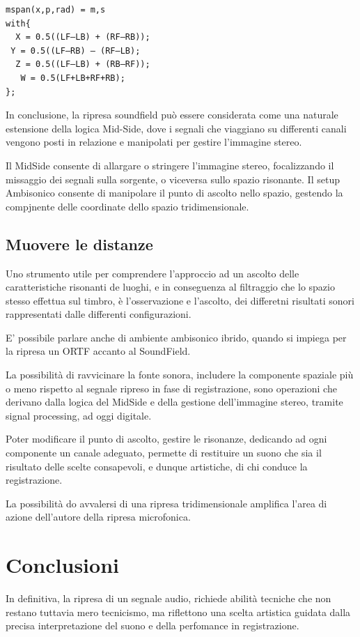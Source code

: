 \begin{lstlisting}
mspan(x,p,rad) = m,s
with{
  X = 0.5((LF–LB) + (RF–RB));
 Y = 0.5((LF–RB) – (RF–LB);
  Z = 0.5((LF–LB) + (RB–RF));
   W = 0.5(LF+LB+RF+RB);
};
\end{lstlisting}

In conclusione, la ripresa soundfield può essere considerata come una 
naturale estensione della logica Mid-Side, dove i segnali che viaggiano 
su differenti canali vengono posti in relazione e manipolati per gestire 
l'immagine stereo.

Il MidSide consente di allargare o stringere l'immagine stereo, focalizzando
il missaggio dei segnali sulla sorgente, o viceversa sullo spazio risonante.
Il setup Ambisonico consente di manipolare il punto di ascolto nello spazio, 
gestendo la compjnente delle coordinate dello spazio tridimensionale.


      
 \subsection*{Muovere le distanze}
 Uno strumento utile per comprendere l'approccio ad un ascolto delle 
 caratteristiche risonanti de luoghi, e in conseguenza al filtraggio che 
 lo spazio stesso effettua sul timbro, è l'osservazione e l'ascolto,
 dei differetni risultati sonori rappresentati dalle differenti configurazioni.
 
 E' possibile parlare anche di ambiente ambisonico ibrido, quando si impiega
 per la ripresa un ORTF accanto al SoundField.
 
 La possibilità di ravvicinare la fonte sonora, includere la componente spaziale
 più o meno rispetto al segnale ripreso in fase di registrazione, sono operazioni
 che derivano dalla logica del MidSide e della gestione dell'immagine stereo,
tramite signal processing, ad oggi digitale.

Poter modificare il punto di ascolto, gestire le risonanze, dedicando ad ogni
componente un canale adeguato, permette di restituire un suono che sia il 
risultato delle scelte consapevoli, e dunque artistiche, di chi conduce la registrazione.

La possibilità do avvalersi di una ripresa tridimensionale amplifica l'area di azione
dell'autore della ripresa microfonica. 



 
\section*{Conclusioni}
  In definitiva, la ripresa di un segnale audio, richiede abilità tecniche che non restano 
  tuttavia mero tecnicismo, ma riflettono una scelta artistica guidata dalla precisa 
  interpretazione del suono e della perfomance in registrazione.
  
